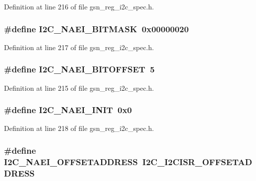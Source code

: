 Definition at line 216 of file gsn\_\-reg\_\-i2c\_\-spec.h.

\hypertarget{a00558_a001c8ca8e454a95222b230795b93d984}{
\subsubsection[{I2C\_\-NAEI\_\-BITMASK}]{\setlength{\rightskip}{0pt plus 5cm}\#define I2C\_\-NAEI\_\-BITMASK~0x00000020}}
\label{a00558_a001c8ca8e454a95222b230795b93d984}


Definition at line 217 of file gsn\_\-reg\_\-i2c\_\-spec.h.

\hypertarget{a00558_a69d8f81fc886c422d8d8a4cf5985a5c4}{
\subsubsection[{I2C\_\-NAEI\_\-BITOFFSET}]{\setlength{\rightskip}{0pt plus 5cm}\#define I2C\_\-NAEI\_\-BITOFFSET~5}}
\label{a00558_a69d8f81fc886c422d8d8a4cf5985a5c4}


Definition at line 215 of file gsn\_\-reg\_\-i2c\_\-spec.h.

\hypertarget{a00558_a4fe4d9da3233b3332c110cfa9616f55a}{
\subsubsection[{I2C\_\-NAEI\_\-INIT}]{\setlength{\rightskip}{0pt plus 5cm}\#define I2C\_\-NAEI\_\-INIT~0x0}}
\label{a00558_a4fe4d9da3233b3332c110cfa9616f55a}


Definition at line 218 of file gsn\_\-reg\_\-i2c\_\-spec.h.

\hypertarget{a00558_a9b86c5bdfaa6716519e71fd9c95aed99}{
\subsubsection[{I2C\_\-NAEI\_\-OFFSETADDRESS}]{\setlength{\rightskip}{0pt plus 5cm}\#define I2C\_\-NAEI\_\-OFFSETADDRESS~I2C\_\-I2CISR\_\-OFFSETADDRESS}}
\label{a00558_a9b86c5bdfaa6716519e71fd9c95aed99}


